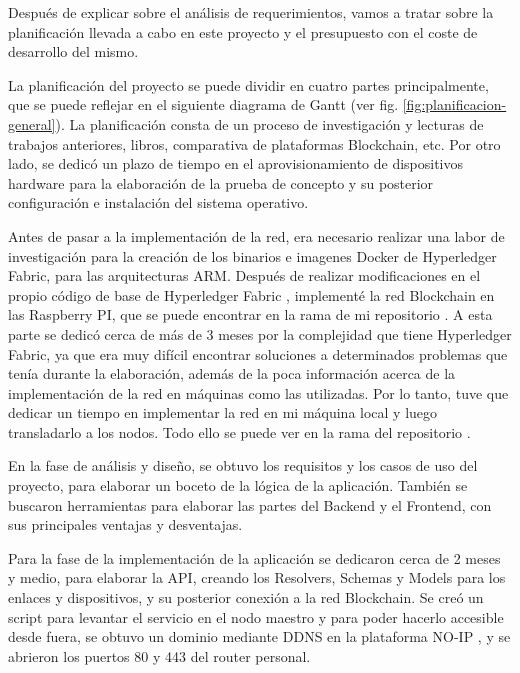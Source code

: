 Después de explicar sobre el análisis de requerimientos, vamos a tratar sobre la planificación llevada a cabo en este 
proyecto y el presupuesto con el coste de desarrollo del mismo.

\vspace{5mm}

\noindent La planificación del proyecto se puede dividir en cuatro partes principalmente, que se puede reflejar en el 
siguiente diagrama de Gantt (ver fig. \ref{fig:planificacion-general}). La planificación consta de un proceso de 
investigación y lecturas de trabajos anteriores, libros, comparativa de plataformas Blockchain, etc. Por otro lado, se 
dedicó un plazo de tiempo en el aprovisionamiento de dispositivos hardware para la elaboración de la prueba de concepto y 
su posterior configuración e instalación del sistema operativo.

\vspace{5mm}

\noindent Antes de pasar a la implementación de la red, era necesario realizar una labor de investigación para la creación 
de los binarios e imagenes Docker de Hyperledger Fabric, para las arquitecturas ARM. Después de realizar modificaciones en 
el propio código de base de Hyperledger Fabric \cite{fork-fabric-baseimage}, implementé la red Blockchain en las Raspberry PI, 
que se puede encontrar en la rama  de mi repositorio \cite{repo}. A esta parte se dedicó cerca de más 
de 3 meses por la complejidad que tiene Hyperledger Fabric, ya que era muy difícil encontrar soluciones a determinados 
problemas que tenía durante la elaboración, además de la poca información acerca de la implementación de la red en máquinas 
como las utilizadas. Por lo tanto, tuve que dedicar un tiempo en implementar la red en mi máquina local y luego 
transladarlo a los nodos. Todo ello se puede ver en la rama  del repositorio \cite{repo}. 

\vspace{5mm}

\noindent En la fase de análisis y diseño, se obtuvo los requisitos y los casos de uso del proyecto, para elaborar un 
boceto de la lógica de la aplicación. También se buscaron herramientas para elaborar las partes del Backend y el Frontend, 
con sus principales ventajas y desventajas.

\vspace{5mm}

\noindent Para la fase de la implementación de la aplicación se dedicaron cerca de 2 meses y medio, para elaborar la API, 
creando los Resolvers, Schemas y Models para los enlaces y dispositivos, y su posterior conexión a la red Blockchain. Se 
creó un script para levantar el servicio en el nodo maestro y para poder hacerlo accesible desde fuera, se obtuvo un 
dominio mediante DDNS en la plataforma NO-IP \cite{no-ip}, y se abrieron los puertos 80 y 443 del router personal.

